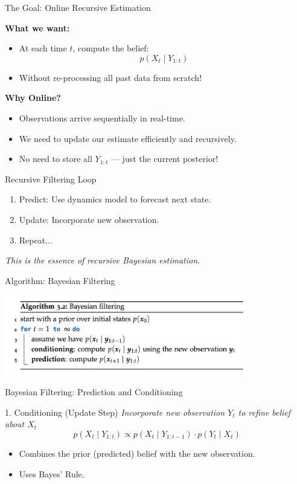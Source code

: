 \documentclass[handout,aspectratio=169]{beamer}
\begin{document}
\begin{frame}{The Goal: Online Recursive Estimation}

\textbf{What we want:}
\begin{itemize}
  \item At each time \( t \), compute the belief:
  \[
    p(X_t \mid Y_{1:t})
  \]
  \item Without re-processing all past data from scratch!
\end{itemize}


\textbf{Why Online?}
\begin{itemize}
  \item Observations arrive sequentially in real-time.
  \item We need to update our estimate efficiently and recursively.
  \item No need to store all \( Y_{1:t} \) — just the current posterior!
\end{itemize}


\begin{block}{Recursive Filtering Loop}
\begin{enumerate}
  \item Predict: Use dynamics model to forecast next state.
  \item Update: Incorporate new observation.
  \item Repeat...
\end{enumerate}
\end{block}


\textit{This is the essence of recursive Bayesian estimation.}

\end{frame}

\begin{frame}{Algorithm: Bayesian Filtering}

\includegraphics[width=0.8\textwidth]{chapter_figs/02_figs/algorithm.png} 
\end{frame}

\begin{frame}{Bayesian Filtering: Prediction and Conditioning}
\begin{block}{1. Conditioning (Update Step)}
\textit{Incorporate new observation \( Y_t \) to refine belief about \( X_t \)}
\[
p(X_t \mid Y_{1:t}) \propto p(X_t \mid Y_{1:t-1}) \cdot p(Y_t \mid X_t) \tag{3.8}
\]
\begin{itemize}
  \item Combines the prior (predicted) belief with the new observation.
  \item Uses Bayes’ Rule.
\end{itemize}
\end{block}
\end{frame}
\end{document}
